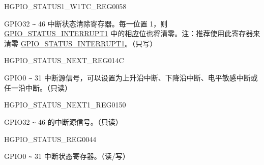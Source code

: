 \begin{register}{H}{GPIO\_STATUS1\_W1TC\_REG}{\hexprefix{}0058}\label{regdesc:GPIOSTATUS1W1TCREG}
%
%
\regnewline%
\begin{regdesc}\begin{reglist}
\label{fielddesc:GPIOSTATUS1W1TC}\item [GPIO\_STATUS1\_W1TC] GPIO32 \verb+~+ 46 中断状态清除寄存器。每一位置 1，则  \hyperref[fielddesc:GPIOSTATUS1INTERRUPT]{GPIO\_STATUS\_INTERRUPT1} 中的相应位也将清零。注：推荐使用此寄存器来清零 \hyperref[fielddesc:GPIOSTATUS1INTERRUPT]{GPIO\_STATUS\_INTERRUPT1}。（只写）
\end{reglist}\end{regdesc}
\end{register}


\begin{register}{H}{GPIO\_STATUS\_NEXT\_REG}{\hexprefix{}014C}\label{regdesc:GPIOSTATUSNEXTREG}
%
\regnewline%
\begin{regdesc}\begin{reglist}
\label{fielddesc:GPIOSTATUSINTERRUPTNEXT}\item [GPIO\_STATUS\_INTERRUPT\_NEXT] GPIO0 \verb+~+ 31 中断源信号，可以设置为上升沿中断、下降沿中断、电平敏感中断或任一沿中断。（只读）
\end{reglist}\end{regdesc}
\end{register}


\begin{register}{H}{GPIO\_STATUS\_NEXT1\_REG}{\hexprefix{}0150}\label{regdesc:GPIOSTATUSNEXT1REG}
%
%
\regnewline%
\begin{regdesc}\begin{reglist}
\label{fielddesc:GPIOSTATUS1INTERRUPTNEXT}\item [GPIO\_STATUS1\_INTERRUPT\_NEXT] GPIO32 \verb+~+ 46 的中断源信号。（只读）
\end{reglist}\end{regdesc}
\end{register}


\begin{register}{H}{GPIO\_STATUS\_REG}{\hexprefix{}0044}\label{regdesc:GPIOSTATUSREG}
%
\regnewline%
\begin{regdesc}\begin{reglist}
\label{fielddesc:GPIOSTATUSINTERRUPT}\item [GPIO\_STATUS\_INTERRUPT] GPIO0 \verb+~+ 31 中断状态寄存器。（读/写）
\end{reglist}\end{regdesc}
\end{register}


